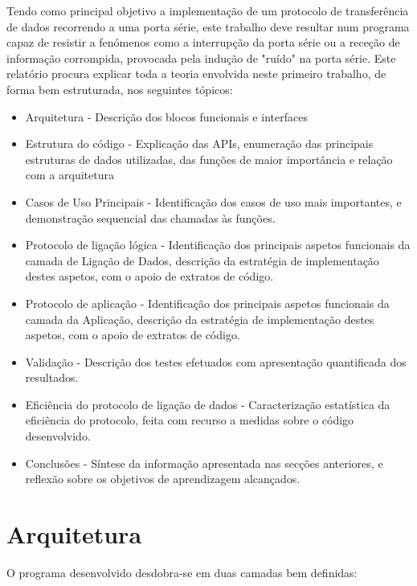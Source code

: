 \documentclass[article, a4paper, 11pt, oneside]{memoir}
\begin{document}
Tendo como principal objetivo a implementação de um protocolo de transferência de dados recorrendo a uma porta série, 
este trabalho deve resultar num programa capaz de resistir a fenómenos como a interrupção da porta série ou a receção de informação corrompida,
provocada pela indução de "ruído" na porta série. Este relatório procura explicar toda a teoria envolvida neste primeiro trabalho, de forma bem estruturada, 
nos seguintes tópicos:
\begin{itemize}
	\item Arquitetura - Descrição dos blocos funcionais e interfaces
	\item Estrutura do código - Explicação das APIs, enumeração das principais estruturas de dados utilizadas, das funções de maior importância e relação com a arquitetura
	\item Casos de Uso Principais - Identificação dos casos de uso mais importantes, e demonstração sequencial das chamadas às funções.
	\item Protocolo de ligação lógica - Identificação dos principais aspetos funcionais da camada de Ligação de Dados, descrição da estratégia de implementação destes aspetos, com o apoio de extratos de código.
	\item Protocolo de aplicação - Identificação dos principais aspetos funcionais da camada da Aplicação, descrição da estratégia de implementação destes aspetos, com o apoio de extratos de código.
	\item Validação - Descrição dos testes efetuados com apresentação quantificada dos resultados.
	\item Eficiência do protocolo de ligação de dados - Caracterização estatística da eficiência do protocolo, feita com recurso a medidas sobre o código desenvolvido.
	\item Conclusões - Síntese da informação apresentada nas secções anteriores, e reflexão sobre os objetivos de aprendizagem alcançados.
\end{itemize}

\chapter[Arquitetura][Arquitetura]{Arquitetura} \label{\thechapter}

O programa desenvolvido desdobra-se em duas camadas bem definidas: 
\end{document}
